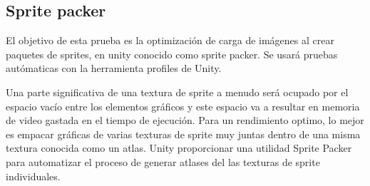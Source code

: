 

\subsection{Sprite packer}
El objetivo de esta prueba es la optimización de carga de imágenes al crear paquetes de sprites, en unity conocido como sprite packer. Se usará pruebas autómaticas con la herramienta profiles de Unity.

Una parte significativa de una textura de sprite a menudo será ocupado por el espacio vacío entre los elementos gráficos y este espacio va a resultar en memoria de video gastada en el tiempo de ejecución. Para un rendimiento optimo, lo mejor es empacar gráficas de varias texturas de sprite muy juntas dentro de una misma textura conocida como un atlas. Unity proporcionar una utilidad Sprite Packer para automatizar el proceso de generar atlases del las texturas de sprite individuales.

